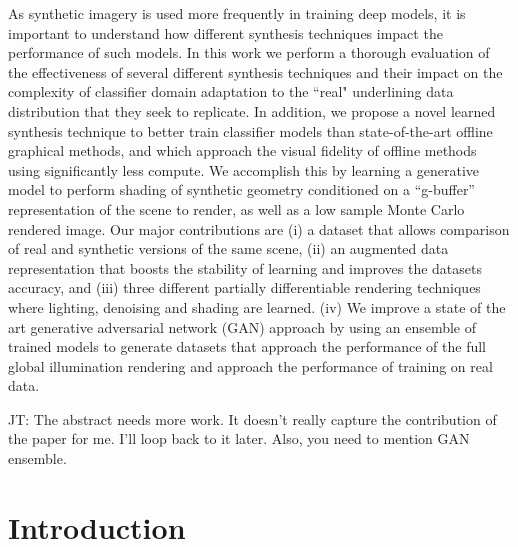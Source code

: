 \documentclass[10pt,twocolumn,letterpaper]{article}
\newcommand{\tompson}[1]{{\color{green} JT: #1}}
\begin{document}
As synthetic imagery is used more frequently in training deep models, it is important to understand how different synthesis techniques impact the performance of such models. In this work we perform a thorough evaluation of the effectiveness of several different synthesis techniques and their impact on the complexity of classifier domain adaptation to the ``real" underlining data distribution that they seek to replicate. In addition, we propose a novel learned synthesis technique to better train classifier models than state-of-the-art offline graphical methods, and which approach the visual fidelity of offline methods using significantly less compute.  We accomplish this by learning a generative model to perform shading of synthetic geometry conditioned on a ``g-buffer'' representation of the scene to render, as well as a low sample Monte Carlo rendered image. Our major contributions are (i) a dataset that allows comparison of real and synthetic versions of the same scene, (ii) an augmented data representation that boosts the stability of learning and improves the datasets accuracy, and (iii) three different partially differentiable rendering techniques where lighting, denoising and shading are learned. (iv) We improve a state of the art generative adversarial network (GAN) approach by using an ensemble of trained models to generate datasets that approach the performance of the full global illumination rendering and approach the performance of training on real data.

\tompson{The abstract needs more work. It doesn't really capture the contribution of the paper for me. I'll loop back to it later. Also, you need to mention GAN ensemble.}

\section{Introduction}
\end{document}
